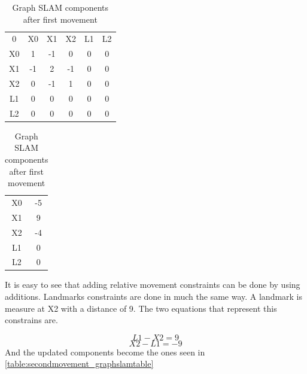 \documentclass[Main]{subfiles}
\begin{document}
\begin{table}[H]
	\begin{subtable}{0.5\linewidth}
		\centering
	\begin{tabular}{cccccc}
		0 & X0 & X1 & X2 & L1 & L2 \\ 
		X0 & 1 & -1 & 0 & 0 & 0  \\ 
		X1 & -1 & 2 & -1 & 0 & 0  \\ 
		X2 & 0 & -1 & 1 & 0 & 0  \\  
		L1 & 0 & 0 & 0 & 0 & 0  \\ 
		L2 & 0 & 0 & 0 & 0 & 0  \\ 
	\end{tabular}
	\caption{$\Omega$ }
	\end{subtable}
	\begin{subtable}{0.5\linewidth}
		\centering
		\begin{tabular}{cc}
			X0 & -5 \\ 
			X1 & 9 \\ 
			X2 & -4 \\ 
			L1 & 0 \\  
			L2 & 0 \\ 
		\end{tabular}
	\caption{$\xi$}
	\end{subtable}
\caption{Graph SLAM components after first movement}
\label{table:secondmovement_graphslamtable} 
\end{table} \noindent

It is easy to see that adding relative movement constraints can be done by using additions. Landmarks constraints are done in much the same way.
A landmark is measure at X2 with a distance of 9. The two equations that represent this constrains are.

	\begin{equation}
		L1 - X2 = 9
	\end{equation}
	\begin{equation}
		X2 - L1 = -9
	\end{equation}
And the updated components become the ones seen in \autoref{table:secondmovement_graphslamtable}
\end{document}
